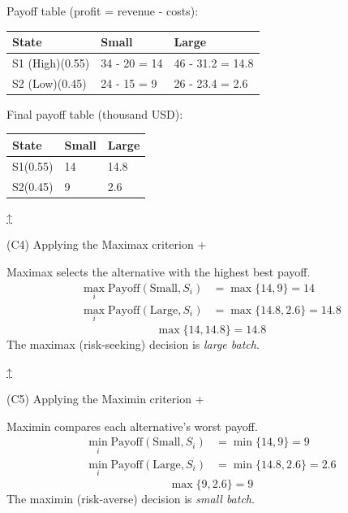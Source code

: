\documentclass[11pt]{article}
\begin{document}
	
	Payoff table (profit = revenue - costs):
	\begin{center}
		\begin{tabular}{lll}
			\toprule
			State & Small & Large \\
			\midrule
			S1 (High)\newline (0.55) & 34 - 20 = 14 & 46 - 31.2 = 14.8 \\
			S2 (Low)\newline (0.45) & 24 - 15 = 9 & 26 - 23.4 = 2.6 \\
			\bottomrule
		\end{tabular}
	\end{center}
	
	
	Final payoff table (thousand USD):
	\begin{center}
		\begin{tabular}{lll}
			\toprule
			State & Small & Large \\
			\midrule
			S1\newline (0.55) & 14 & 14.8 \\
			S2\newline (0.45) & 9 & 2.6 \\
			\bottomrule
		\end{tabular}
	\end{center}
	
	
	
	
	\hyperref[problem3a-criteria]{↑}
	
	
	
	
	(C4) Applying the Maximax criterion
	+
	
	
	Maximax selects the alternative with the highest best payoff.
	\[
	\begin{aligned}
		\max_i \text{Payoff}(\text{Small}, S_i) &= \max\{14, 9\} = 14 \\
		\max_i \text{Payoff}(\text{Large}, S_i) &= \max\{14.8, 2.6\} = 14.8
	\end{aligned}
	\]
	\[
	\max\{14, 14.8\} = 14.8
	\]
	The maximax (risk-seeking) decision is \emph{large batch}.
	
	
	\hyperref[problem3a-criteria]{↑}
	
	
	
	
	(C5) Applying the Maximin criterion
	+
	
	
	Maximin compares each alternative's worst payoff.
	\[
	\begin{aligned}
		\min_i \text{Payoff}(\text{Small}, S_i) &= \min\{14, 9\} = 9 \\
		\min_i \text{Payoff}(\text{Large}, S_i) &= \min\{14.8, 2.6\} = 2.6
	\end{aligned}
	\]
	\[
	\max\{9, 2.6\} = 9
	\]
	The maximin (risk-averse) decision is \emph{small batch}.
	
\end{document}
